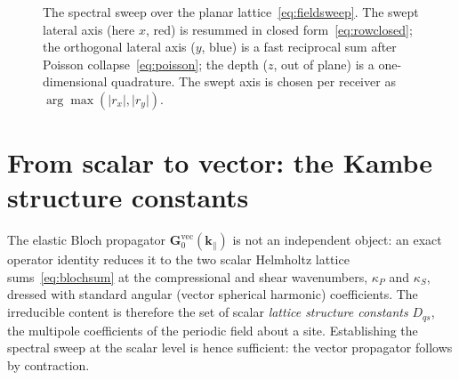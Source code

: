 \documentclass[11pt,a4paper]{article}
\newcommand{\kpar}{\mathbf{k}_{\parallel}}
\newcommand{\vr}{\mathbf{r}}
\newcommand{\vG}{\mathbf{G}}
\newcommand{\Dqs}{D_{q s}}
\begin{document}
\begin{figure}[ht]
\centering
{}
\caption{The spectral sweep over the planar lattice~\eqref{eq:fieldsweep}. The
  swept lateral axis (here $x$, red) is resummed in closed
  form~\eqref{eq:rowclosed}; the orthogonal lateral axis ($y$, blue) is a fast
  reciprocal sum after Poisson collapse~\eqref{eq:poisson}; the depth ($z$,
  out of plane) is a one-dimensional quadrature. The swept axis is chosen per
  receiver as $\arg\max(\lvert r_x\rvert,\lvert r_y\rvert)$.}
\label{fig:threeaxis}
\end{figure}

\section{From scalar to vector: the Kambe structure constants}
\label{sec:vector}

The elastic Bloch propagator $\vG_0^{\mathrm{vec}}(\kpar)$ is not an independent
object: an exact operator identity reduces it to the two scalar Helmholtz
lattice sums~\eqref{eq:blochsum} at the compressional and shear wavenumbers,
$\kappa_P$ and $\kappa_S$, dressed with standard angular (vector spherical
harmonic) coefficients. The irreducible content is therefore the set of scalar
\emph{lattice structure constants} $\Dqs$, the multipole coefficients of the
periodic field about a site. Establishing the spectral sweep at the scalar
level is hence sufficient: the vector propagator follows by contraction.
\end{document}
